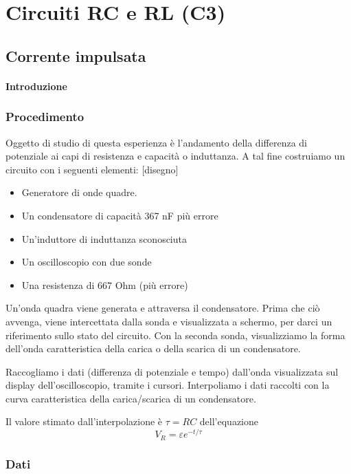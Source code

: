\chapter{Circuiti RC e RL (C3)}

\section{Corrente impulsata}
\subsubsection{Introduzione}

\subsection{Procedimento}

Oggetto di studio di questa esperienza è l'andamento della differenza di potenziale ai capi di resistenza e capacità o induttanza.
A tal fine costruiamo un circuito con i seguenti elementi:
[disegno]

\begin{itemize}
  \item Generatore di onde quadre.
  \item Un condensatore di capacità 367 nF più errore
  \item Un'induttore di induttanza sconosciuta
  \item Un oscilloscopio con due sonde
  \item Una resistenza di 667 Ohm (più errore)
\end{itemize}

Un'onda quadra viene generata e attraversa il condensatore. Prima che ciò avvenga, viene intercettata dalla sonda e visualizzata a schermo, per darci un riferimento sullo stato del circuito.
Con la seconda sonda, visualizziamo la forma dell'onda caratteristica della carica o della scarica di un condensatore.

Raccogliamo i dati (differenza di potenziale e tempo) dall'onda visualizzata sul display dell'oscilloscopio, tramite i cursori. Interpoliamo i dati raccolti con la curva caratteristica della carica/scarica di un condensatore.

Il valore stimato dall'interpolazione è $\tau=RC$ dell'equazione
$$V_R = \varepsilon e^{-t/\tau}$$

\subsection{Dati}


